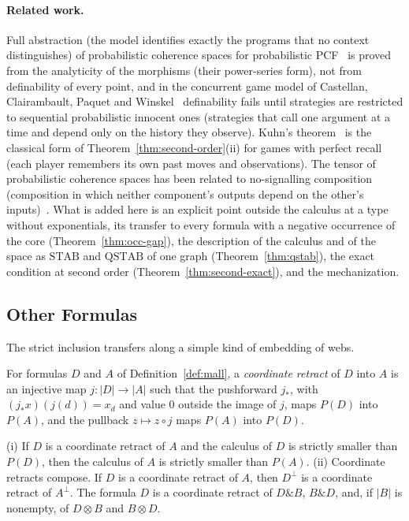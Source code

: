 \paragraph{Related work.}
Full abstraction (the model identifies exactly the programs that no
context distinguishes) of probabilistic coherence spaces for probabilistic
PCF~\cite{ehrhard-pagani-tasson2018} is proved from the analyticity of
the morphisms (their power-series form), not from definability of every
point, and in the concurrent game model of
Castellan, Clairambault, Paquet and Winskel~\cite{castellan2018}
definability fails until strategies are restricted to sequential
probabilistic innocent ones (strategies that call one argument at a time
and depend only on the history they observe). Kuhn's
theorem~\cite{kuhn1953} is the classical form of
Theorem~\ref{thm:second-order}(ii) for games with perfect recall (each
player remembers its own past moves and observations). The tensor of
probabilistic coherence spaces has been related to no-signalling
composition (composition in which neither component's outputs depend on
the other's inputs)~\cite{simmons-kissinger2022}. What
is added here is an explicit point outside the calculus at a type without
exponentials, its transfer to every formula with a negative occurrence of
the core (Theorem~\ref{thm:occ-gap}), the description of the calculus and
of the space as $\mathrm{STAB}$ and $\mathrm{QSTAB}$ of one graph
(Theorem~\ref{thm:qstab}), the exact condition at second order
(Theorem~\ref{thm:second-exact}), and the mechanization.

\subsection{Other Formulas}
\label{sec:second-other}

The strict inclusion transfers along a simple kind of embedding of webs.

\begin{definition}
\label{def:retract}
For formulas $D$ and $A$ of Definition~\ref{def:mall}, a \emph{coordinate
retract} of $D$ into $A$ is an injective map $j : |D| \to |A|$ such that
the pushforward $j_{*}$, with $(j_{*}x)(j(d)) = x_d$ and value $0$ outside
the image of $j$, maps $P(D)$ into $P(A)$, and the pullback
$z \mapsto z \circ j$ maps $P(A)$ into $P(D)$.
\end{definition}

\begin{theorem}
\label{thm:retract}
(i) If $D$ is a coordinate retract of $A$ and the calculus of $D$ is
strictly smaller than $P(D)$, then the calculus of $A$ is strictly
smaller than $P(A)$.
(ii) Coordinate retracts compose. If $D$ is a coordinate retract of $A$,
then $D^{\perp}$ is a coordinate retract of $A^{\perp}$. The formula $D$
is a coordinate retract of $D \mathbin{\&} B$, $B \mathbin{\&} D$, and,
if $|B|$ is nonempty, of $D \otimes B$ and $B \otimes D$.
\end{theorem}

